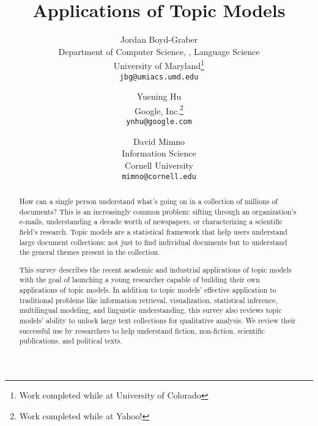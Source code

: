 \documentclass{now}  %
\title{Applications of Topic Models}
\author{
Jordan Boyd-Graber \\
Department of Computer Science, \abr{umiacs}, Language Science \\
University of Maryland\footnote{Work completed while at University of Colorado} \\
\texttt{jbg@umiacs.umd.edu}
\and
Yuening Hu \\
Google, Inc.\footnote{Work completed while at Yahoo!} \\
\texttt{ynhu@google.com}
\and
David Mimno \\
Information Science \\
Cornell University \\
\texttt{mimno@cornell.edu}
}
\begin{document}

\frontmatter  %

\maketitle

\tableofcontents

\mainmatter

\begin{abstract}
\setcounter{page}{1}
  How can a single person understand what's going on in a collection
  of millions of documents?  This is an increasingly common problem:
  sifting through an organization's e-mails, understanding a decade
  worth of newspapers, or characterizing a scientific field's
  research.  Topic models are a statistical framework that help users
  understand large document collections: not just to find individual
  documents but to understand the general themes
  present in the collection.

  This survey describes the recent academic and industrial
  applications of topic models with the goal of launching a young
  researcher capable of building their own applications of topic
  models.  In addition to topic models' effective application to
  traditional problems like information retrieval, visualization,
  statistical inference, multilingual modeling, and linguistic
  understanding, this survey also reviews topic models' ability to
  unlock large text collections for qualitative analysis.  We review
  their successful use by researchers to help understand fiction,
  non-fiction, scientific publications, and political texts.
\end{abstract}












\backmatter  %




\clearpage

\printindex
\end{document}
